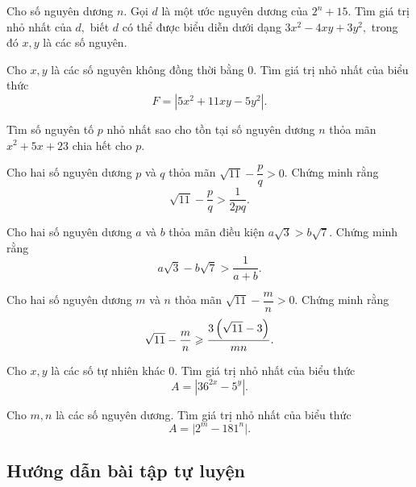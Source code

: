 \begin{btt}
Cho số nguyên dương $n.$ Gọi $d$ là một ước nguyên dương của $2^n+15.$ Tìm giá trị nhỏ nhất của $d,$ biết $d$ có thể được biểu diễn dưới dạng $3x^2-4xy+3y^2,$ trong đó $x,y$ là các số nguyên.
\end{btt}

\begin{btt}
Cho $x,y$ là các số nguyên không đồng thời bằng $0.$ Tìm giá trị nhỏ nhất của biểu thức
\[F=\left|5x^2+11xy-5y^2\right|.\]
\end{btt}

\begin{btt}
Tìm số nguyên tố $p$ nhỏ nhất sao cho tồn tại số nguyên dương $n$ thỏa mãn $x^2+5x+23$ chia hết cho $p.$
\end{btt}

\begin{btt}
Cho hai số nguyên dương $p$ và $q$ thỏa mãn $\sqrt{11}-\dfrac{p}{q}>0$. Chứng minh rằng
$$\sqrt{11}-\dfrac{p}{q}> \dfrac{1}{2p q}.$$
\end{btt}

\begin{btt}
Cho hai số nguyên dương $a$ và $b$ thỏa mãn điều kiện $a\sqrt{3} >b \sqrt{7}.$ Chứng minh rằng  \[a\sqrt{3}-b\sqrt{7} >\dfrac{1}{a+b}.\]
\end{btt}

\begin{btt}
Cho hai số nguyên dương $m$ và $n$ thỏa mãn $\sqrt{11}-\dfrac{m}{n}>0$. Chứng minh rằng
$$\sqrt{11}-\dfrac{m}{n} \geqslant \dfrac{3\left(\displaystyle \sqrt{11}-3 \right)}{m n}.$$
\end{btt}

\begin{btt}
Cho $x, y$ là các số tự nhiên khác $0.$ Tìm giá trị nhỏ nhất của biểu thức \[A=\left| 36^{2x}-5^y \right|.\]
\end{btt}

\begin{btt}
Cho $m,n$ là các số nguyên dương. Tìm giá trị nhỏ nhất của biểu thức $$A=\Big|2^m-181^n\Big|.$$ 
\end{btt}

\subsection*{Hướng dẫn bài tập tự luyện}

